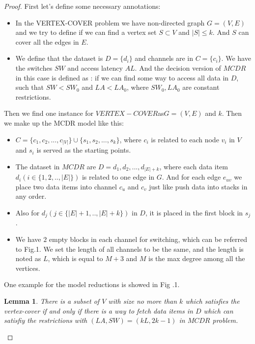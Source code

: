 \documentclass[12pt,a4paper]{article}
\newtheorem{lemma}[theorem]{Lemma}
\theoremstyle{definition}
\begin{document}
\begin{enumerate}
\begin{proof}
	First let's define some necessary annotations: 
	
	\begin{itemize}
		\item In the VERTEX-COVER problem we have non-directed graph $G = (V, E)$ and we try to define if we can find a vertex set $S \subset V$ and $|S| \leq k$.
	And $S$ can cover all the edges in $E$.

	   \item We define that the dataset is $D = \{ d_i\}$ and channels are in $C = \{c_i\}$. We have the switches $SW$ and access latency $AL$. And the decision version of $MCDR$ in this case is 
	   defined as : if we can find some way to access all data in $D$, such that $SW < SW_0$ and $LA < LA_0$, where $SW_0, LA_0$ are constant restrictions.

	\end{itemize}

	Then we find one instance for $VERTEX-COVER$as$G = (V,E)$ and $k$. Then we make up the MCDR model like this:

	\begin{itemize}
		\item $C = \{c_1, c_2, ..., c_ {|V|}\} \cup \{ s_1, s_2, ..., s_k\}$, where $c_i$ is related to each node $v_i$ in $V$ and $s_i$ is
		served as the starting points.

		\item The dataset in $MCDR$ are $D = {d_1, d_2, ..., d_{|E|+k}}$, where each data item $d_i(i\in\{1, 2, .., |E|\})$ is related to one edge in $G$. And for each edge $e_{uv}$ we place two data items into  
	channel $c_u$ and $c_v$ just like push data into stacks in any order.
		
	    \item Also for $d_j(j \in \{|E|+1, .., |E|+k\})$ in $D$, it is placed in the first block in $s_j$.
	
		\item We have $2$ empty blocks in each channel for switching, which can be referred to Fig.1. We set the length of all channels to be the same, and the length is noted as $L$, which is equal to $M + 3$ and $M$ is the max degree among all the vertices.
	\end{itemize}
		 
	One example for the model reductions is showed in Fig .1.

	\begin{lemma}
		There is a subset of $V$ with size no more than $k$ which satisfies the vertex-cover if and only if there is a way to fetch data items in $D$ which can satisfiy the restrictions 
		with $(LA, SW) = (kL, 2k-1)$ in $MCDR$ problem.
	\end{lemma}
	

\end{proof}
\end{enumerate}
\end{document}
